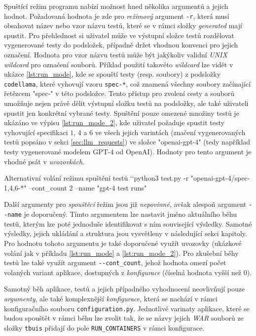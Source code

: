 \documentclass[czech, ma, kiv, he, iso690alph, pdf, viewonly]{fasthesis}
\begin{document}
    Spuštící režim programu nabízí možnost hned několika argumentů a jejich hodnot. Požadovaná hodnota je zde pro \textit{režimový} argument \verb|-r|, která musí obsahovat název nebo vzor názvu testů, které se v rámci složky \textit{generated} mají spustit. Pro přehlednost si uživatel může ve výstupní složce testů rozdělovat vygenerované testy do podsložek, případně držet vhodnou konvenci pro jejich označení. Hodnota pro vzor názvu testů může být jakýkoliv validní \textit{UNIX wildcard} pro označení souborů. Příklad použití takovéto \textit{wildcard} lze vidět v ukázce \ref{lst:run_mode}, kde se spouští testy (resp. soubory) z podsložky \verb|codellama|, které vyhovují vzoru \verb|spec-*|, což znamená všechny soubory začínající řetězcem "spec-"  v této podsložce. Tento přístup pro zvolení cesty a souborů umožňuje nejen právě dělit výstupní složku testů na podsložky, ale také uživateli spustit jen konkrétní vybrané testy. Spuštění pouze omezené množiny testů je ukázáno ve výpisu \ref{lst:run_mode_2}, kde uživatel požaduje spustit testy vyhovující specifikaci \(1\), \(4\) a \(6\) ve všech jejich varintách (značení vygenerovaných testů popsáno v sekci \ref{sec:llm_requests}) ve složce "openai-gpt-4" (tedy například testy vygenerované modelem GPT-4 od OpenAI). Hodnoty pro tento argument je vhodné psát v \emph{uvozovkách}.

    \begin{console}{Alternativní volání režimu spuštění testů \label{lst:run_mode_2}}
`\uxprompt`python3 test.py -r "openai-gpt-4/spec-{1,4,6}-*" --cont_count 2 --name "gpt-4 test runs"
    \end{console}

    Další argumenty pro \textit{spouštěcí} řežim jsou již \emph{nepovinné}, avšak alespoň argument \verb|--name| je doporučený. Tímto argumentem lze nastavit jméno aktuálního běhu testů, kterým lze poté jednoduše identifikovat s ním související výsledky. Samotné výsledky, jejich ukládání a struktura jsou vysvětleny v následující sekci kapitoly. Pro hodnotu tohoto argumentu je také doporučené využít uvozovky (ukázkové volání jak v příkladu \ref{lst:run_mode} a \ref{lst:run_mode_2}). Pro zkušební běhy testů lze také využít argument \verb|--cont_count|, jehož hodnota omezí počet volaných variant aplikace, dostupných z \textit{konfigurace} (číselná hodnota vyšší než \(0\)).

    Samotný běh aplikace, testů a jejich případného vyhodnocení neovlivňují pouze \emph{argumenty}, ale také komplexnější \emph{konfigurace}, která se nachází v rámci konfiguračního souboru \verb|configuration.py|. Jednotlivé varinaty aplikace, které se budou spouštět v rámci běhu lze zvolit tak, že se názvy jejich \textit{WAR} souborů ze složky \verb|tbuis| přidají do pole \verb|RUN_CONTAINERS| v rámci konfigurace. 
\end{document}
